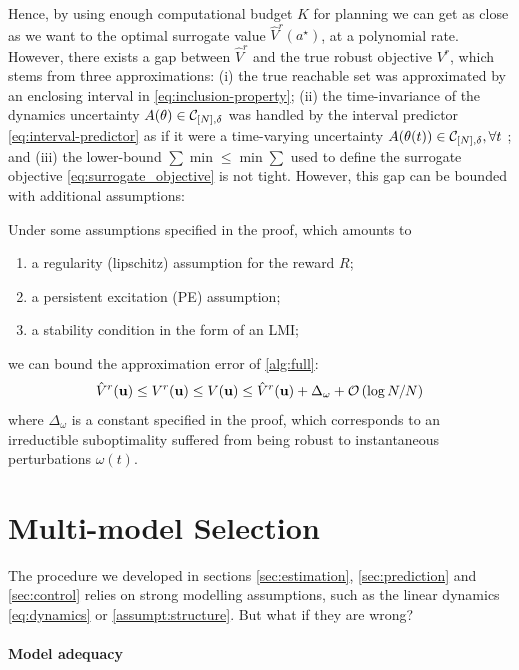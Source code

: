 \documentclass{article}
\begin{document}
Hence, by using enough computational budget $K$ for planning we can get as close as we want to the optimal surrogate value $\hat{V}^r(a^{\star})$, at a polynomial rate. However, there exists a gap between $\hat{V}^r$ and the true robust objective $V^r$, which stems from three approximations: (i) the true reachable set was approximated by an enclosing interval in \eqref{eq:inclusion-property}; (ii) the time-invariance of the dynamics uncertainty $A(\theta)\in\mathcal{C}_{[N],\delta}$ was handled by the interval predictor \eqref{eq:interval-predictor} as if it were a time-varying uncertainty $A(\theta(t))\in\mathcal{C}_{[N],\delta},\forall t$ ; and (iii) the lower-bound $\sum\min\leq \min\sum$ used to define the surrogate objective \eqref{eq:surrogate_objective} is not tight. However, this gap can be bounded with additional assumptions:
\begin{theorem}
\label{thm:control-error}
Under some assumptions specified in the proof, which amounts to
\begin{enumerate}
	\item a regularity (lipschitz) assumption for the reward $R$;
	\item a persistent excitation (PE) assumption;
	\item a stability condition in the form of an LMI;
\end{enumerate}
 we can bound the approximation error of \autoref{alg:full}:
\begin{equation*}
\hat{V}^r(\mathbf{u}) \leq {V}^r(\mathbf{u}) \leq V(\mathbf{u}) \leq \hat{V}^r(\mathbf{u}) + \Delta_\omega + \mathcal{O}\left({\log N / N}\right)
\end{equation*}
where $\Delta_\omega$ is a constant specified in the proof, which corresponds to an irreductible suboptimality suffered from being robust to instantaneous perturbations $\omega(t)$.
\end{theorem}


\section{Multi-model Selection}
\label{sec:multi-model}

The procedure we developed in sections \ref{sec:estimation}, \ref{sec:prediction} and \ref{sec:control} relies on strong modelling assumptions, such as the linear dynamics \eqref{eq:dynamics} or \autoref{assumpt:structure}. But what if they are wrong?

\paragraph{Model adequacy}
\end{document}
